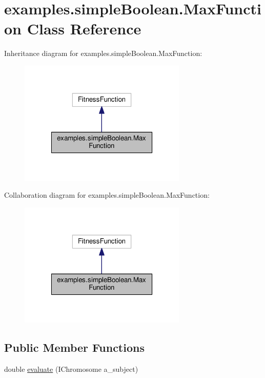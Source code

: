 \hypertarget{classexamples_1_1simple_boolean_1_1_max_function}{\section{examples.\-simple\-Boolean.\-Max\-Function Class Reference}
\label{classexamples_1_1simple_boolean_1_1_max_function}
}


Inheritance diagram for examples.\-simple\-Boolean.\-Max\-Function\-:
\nopagebreak
\begin{figure}[H]
\begin{center}
\leavevmode
\includegraphics[width=226pt]{classexamples_1_1simple_boolean_1_1_max_function__inherit__graph}
\end{center}
\end{figure}


Collaboration diagram for examples.\-simple\-Boolean.\-Max\-Function\-:
\nopagebreak
\begin{figure}[H]
\begin{center}
\leavevmode
\includegraphics[width=226pt]{classexamples_1_1simple_boolean_1_1_max_function__coll__graph}
\end{center}
\end{figure}
\subsection*{Public Member Functions}
\begin{DoxyCompactItemize}
\item 
double \hyperlink{classexamples_1_1simple_boolean_1_1_max_function_a9645cc778cdec51bfb1e872a9dd7401b}{evaluate} (I\-Chromosome a\-\_\-subject)
\end{DoxyCompactItemize}
